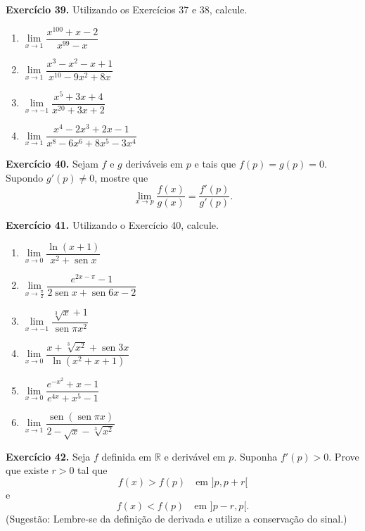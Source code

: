 \documentclass[12pt,a4paper]{article}
\begin{document}
\vspace{0.5cm}
\noindent\textbf{Exercício 39.} Utilizando os Exercícios 37 e 38, calcule.
\begin{enumerate}
    \renewcommand{\theenumi}{\alph{enumi}}
    \renewcommand{\labelenumi}{\theenumi)}
    \item $\lim\limits_{x \to 1} \dfrac{x^{100} + x - 2}{x^{99} - x}$
    \item $\lim\limits_{x \to 1} \dfrac{x^3 - x^2 - x + 1}{x^{10} - 9x^2 + 8x}$
    \item $\lim\limits_{x \to -1} \dfrac{x^5 + 3x + 4}{x^{20} + 3x + 2}$
    \item $\lim\limits_{x \to 1} \dfrac{x^4 - 2x^3 + 2x - 1}{x^8 - 6x^6 + 8x^5 - 3x^4}$
\end{enumerate}

\vspace{0.5cm}
\noindent\textbf{Exercício 40.}
Sejam $f$ e $g$ deriváveis em $p$ e tais que $f(p) = g(p) = 0$. Supondo $g'(p) \neq 0$, mostre que
\[
\lim_{x \to p} \dfrac{f(x)}{g(x)} = \dfrac{f'(p)}{g'(p)}.
\]

\vspace{0.5cm}
\noindent\textbf{Exercício 41.} Utilizando o Exercício 40, calcule.
\begin{enumerate}
    \renewcommand{\theenumi}{\alph{enumi}}
    \renewcommand{\labelenumi}{\theenumi)}
    \item $\lim\limits_{x \to 0} \dfrac{\ln(x + 1)}{x^2 + \operatorname{sen} x}$
    \item $\lim\limits_{x \to \frac{\pi}{2}} \dfrac{e^{2x - \pi} - 1}{2\operatorname{sen} x + \operatorname{sen} 6x - 2}$
    \item $\lim\limits_{x \to -1} \dfrac{\sqrt[3]{x} + 1}{\operatorname{sen}\pi x^2}$
    \item $\lim\limits_{x \to 0} \dfrac{x + \sqrt[3]{x^2} + \operatorname{sen} 3x}{\ln(x^2 + x + 1)}$
    \item $\lim\limits_{x \to 0} \dfrac{e^{-x^2} + x - 1}{e^{4x} + x^5 - 1}$
    \item $\lim\limits_{x \to 1} \dfrac{\operatorname{sen}(\operatorname{sen}\pi x)}{2 - \sqrt{x} - \sqrt[3]{x^2}}$
\end{enumerate}

\vspace{0.5cm}
\noindent\textbf{Exercício 42.}
Seja $f$ definida em $\mathbb{R}$ e derivável em $p$. Suponha $f'(p) > 0$. Prove que existe $r > 0$ tal que
\[
f(x) > f(p) \quad \text{em } {]p, p + r[}
\]
e
\[
f(x) < f(p) \quad \text{em } {]p - r, p[}.
\]
(Sugestão: Lembre-se da definição de derivada e utilize a conservação do sinal.)
\end{document}
